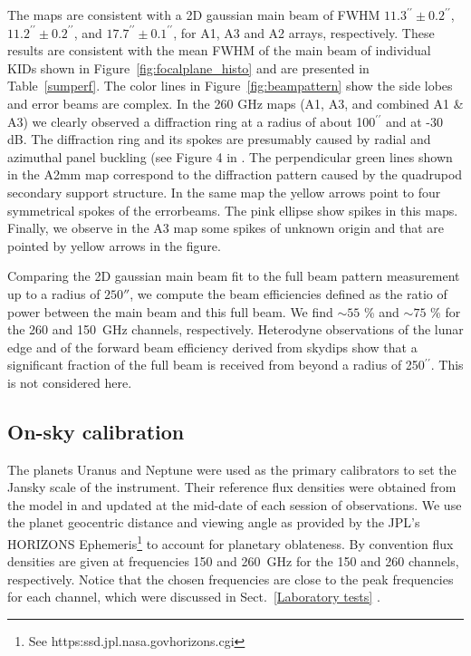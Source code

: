 \documentclass[]{aa} %
\begin{document}
The maps are consistent with a 2D gaussian main beam of FWHM $11.3^{\prime \prime} \pm 0.2^{\prime \prime}$, $11.2^{\prime \prime} \pm 0.2^{\prime \prime}$, and $17.7^{\prime \prime} \pm 0.1^{\prime \prime}$, for A1, A3 and A2 arrays, respectively. These results are consistent with the mean FWHM of the main beam of individual KIDs shown in Figure~\ref{fig:focalplane_histo} and are presented in
Table~\ref{sumperf}.
The color lines in Figure~\ref{fig:beampattern} show the side lobes and error beams are complex. In the 260 GHz maps (A1, A3, and combined A1 \& A3) we clearly observed a diffraction ring at a radius of about 100$^{\prime \prime}$ and at -30 dB. The diffraction ring and its spokes are presumably caused by radial and azimuthal panel buckling (see Figure 4 in \cite{greve1998}. The perpendicular green lines shown in the A2mm map correspond to the diffraction pattern caused by the quadrupod secondary support structure. In the same map the yellow arrows point to four symmetrical spokes of the errorbeams. The pink ellipse show spikes in this maps. Finally, we observe in the A3 map some spikes of unknown origin and that are pointed by yellow arrows in the figure.

Comparing the 2D gaussian main beam fit to the full beam pattern measurement up to a radius of
$250''$, we compute the beam efficiencies defined as the ratio of power between the main beam and this full beam. We find $\sim 55$ \% and $\sim 75$ \% for the 260 and 150~GHz channels, respectively.
Heterodyne observations of the lunar edge and of the forward beam efficiency derived from skydips show that a significant fraction of the full beam is received from beyond a radius of 250$^{\prime \prime}$. This is not considered here.

\subsection{On-sky calibration}
\label{On-sky calibration}

The planets Uranus and Neptune  were used as the primary calibrators to set the Jansky scale of the instrument.
Their reference flux densities were obtained from the model in \cite{moreno2010}
and updated at the mid-date of each session of observations. 
We use the planet geocentric distance
and viewing angle as provided by the JPL's HORIZONS Ephemeris\footnote{See https:\/\/ssd.jpl.nasa.gov\/horizons.cgi} to account for planetary oblateness. 
By convention flux densities are given at frequencies 150 and 260~GHz for the 150 and 260 channels, respectively. Notice that the chosen frequencies are close to the peak frequencies for each channel, which were discussed in Sect.~\ref{Laboratory tests} . \\
\end{document}
